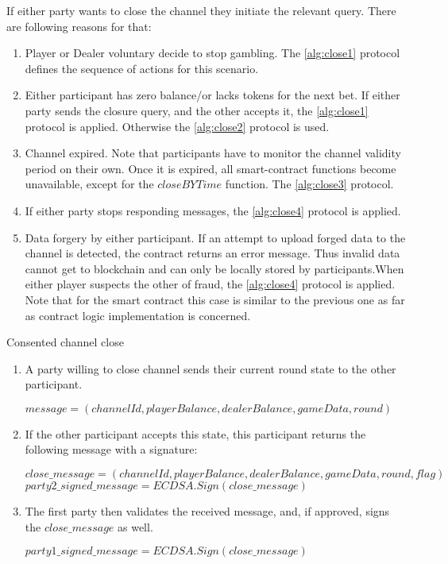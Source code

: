 If either party wants to close the channel they initiate the relevant query. There are following reasons for that: \label{closing}
\begin{enumerate}
	\item Player or Dealer voluntary decide to stop gambling. The \autoref{alg:close1} protocol defines the sequence of actions for this scenario.
	\item Either participant has zero balance/or lacks tokens for the next bet. If either party sends the closure query, and the other accepts it, the \autoref{alg:close1} protocol is applied. Otherwise the \autoref{alg:close2} protocol is used.
	\item Channel expired. Note that participants have to monitor the channel validity period on their own. Once it is expired, all smart-contract functions become unavailable, except for the $closeBYTime$ function. The \autoref{alg:close3} protocol.
	\item If either party stops responding messages, the \autoref{alg:close4} protocol is applied.
	\item  Data forgery by either participant. If an attempt to upload forged data to the channel is detected, the contract returns an error message. Thus invalid data cannot get to blockchain and can only be locally stored by participants.When either player suspects the other of fraud, the \autoref{alg:close4} protocol is applied. Note that for the smart contract this case is similar to the previous one as far as contract logic implementation is concerned.
\end{enumerate}

\begin{algorithm}[H]
\caption{Consented channel close} \label{alg:close1}
\begin{enumerate}
	\item A party willing to close channel sends their current round state to the other participant.
\begin{center}
$message = (channelId, playerBalance, dealerBalance, gameData, round)$
\end{center} 
	\item If the other participant accepts this state, this participant returns the following message with a signature:
\begin{center}
$close\_message = (channelId, playerBalance, dealerBalance, gameData, round, flag)$\\
$party2\_signed\_message = ECDSA.Sign(close\_message)$
\end{center}
	\item The first party then validates the received message, and, if approved, signs the $close\_message$ as well.
\begin{center}
$party1\_signed\_message = ECDSA.Sign(close\_message)$
\end{center}
\end{enumerate}
\end{algorithm}

